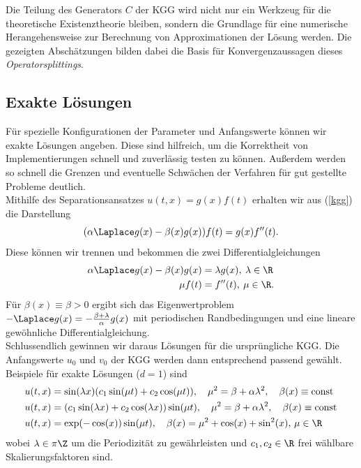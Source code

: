 Die Teilung des Generators $C$ der KGG wird nicht nur ein Werkzeug für die theoretische Existenztheorie bleiben, sondern die Grundlage für eine numerische Herangehensweise zur Berechnung von Approximationen der Lösung werden. Die gezeigten Abschätzungen bilden dabei die Basis für Konvergenzaussagen dieses \emph{Operatorsplittings}.
\subsection{Exakte Lösungen}
Für spezielle Konfigurationen der Parameter und Anfangswerte können wir exakte Lösungen angeben. Diese sind hilfreich, um die Korrektheit von Implementierungen schnell und zuverlässig testen zu können. Außerdem werden so schnell die Grenzen und eventuelle Schwächen der Verfahren für gut gestellte Probleme deutlich.\\[0.5cm]
Mithilfe des Separationsansatzes $u(t,x)=g(x)f(t)$ erhalten wir aus (\ref{kgg}) die Darstellung
\begin{equation*}
(\alpha\Laplace g(x)-\beta(x)g(x))f(t) = g(x)f''(t).
\end{equation*}
Diese können wir trennen und bekommen die zwei Differentialgleichungen
\begin{align*}
\alpha\Laplace g(x)-\beta(x)g(x)&=\lambda g(x), \: \lambda\in\R\\
\mu f(t)&=f''(t), \: \mu\in \R.
\end{align*}
Für $\beta(x) \equiv \beta>0$ ergibt sich das Eigenwertproblem $-\Laplace g(x)=-\frac{\beta + \lambda}{\alpha}g(x)$ mit periodischen Randbedingungen und eine lineare gewöhnliche Differentialgleichung.\\
Schlussendlich gewinnen wir daraus Lösungen für die ursprüngliche KGG. Die Anfangswerte $u_0$ und $v_0$ der KGG werden dann entsprechend passend gewählt.\\[1cm]
Beispiele für exakte Lösungen ($d=1$) sind
\begin{align*}
u(t,x)&=\sin(\lambda x)(c_1 \sin(\mu t) + c_2 \cos(\mu t)), \quad \mu^2=\beta+\alpha \lambda^2,\quad \beta(x)\equiv \text{const}\\ 
u(t,x)&=(c_1 \sin(\lambda x) + c_2 \cos(\lambda x))\sin(\mu t), \quad \mu^2=\beta+\alpha \lambda^2,\quad \beta(x)\equiv \text{const}\\
u(t,x)&=\exp(-\cos(x))\sin(\mu t), \quad \beta(x)=\mu^2+\cos(x)+\sin^2(x), \, \mu \in \R
\end{align*}
wobei $\lambda\in \pi\Z$ um die Periodizität zu gewährleisten und $c_1, c_2 \in \R$ frei wählbare Skalierungsfaktoren sind.\\
